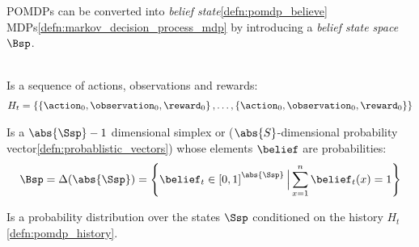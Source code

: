 \begin{sectionbox}\nospacing
  POMDPs can be converted into \textit{belief state}\cref{defn:pomdp_believe} MDPs\cref{defn:markov_decision_process_mdp}
  by introducing a \textit{belief state space} $\Bsp$.
\end{sectionbox}
\begin{defnbox}\nospacing
  \begin{defn}\label{defn:pomdp_history}\leavevmode\\
    Is a sequence of actions, observations and rewards:
    \begin{align*}
      H_{t}=\left\{\left\{\action_{0},\observation_{0},\reward_{0}\right\},\ldots,\left\{\action_{0},\observation_{0},\reward_{0}\right\}\right\}
    \end{align*}
  \end{defn}
\end{defnbox}
\begin{defnbox}\nospacing
  \begin{defn}\label{defn:belief_state_space}
    Is a $\abs{\Ssp}-1$ dimensional simplex or ($\abs{S}$-dimensional probability vector\cref{defn:probablistic_vectors})
    whose elements $\belief$ are probabilities:
    \begin{align}
      \Bsp=\Delta(\abs{\Ssp})=\left\{\belief_{t}\in\left[0,1\right]^{\abs{\Ssp}}\Big|\sum_{x=1}^{n}\belief_{t}(x)=1\right\}
    \end{align}
  \end{defn}
\end{defnbox}
\begin{defnbox}\nospacing
  \begin{defn}\label{defn:belief_state}
    Is a probability distribution over the states $\Ssp$ conditioned on the history $H_{t}$\cref{defn:pomdp_history}.
  \end{defn}
\end{defnbox}
